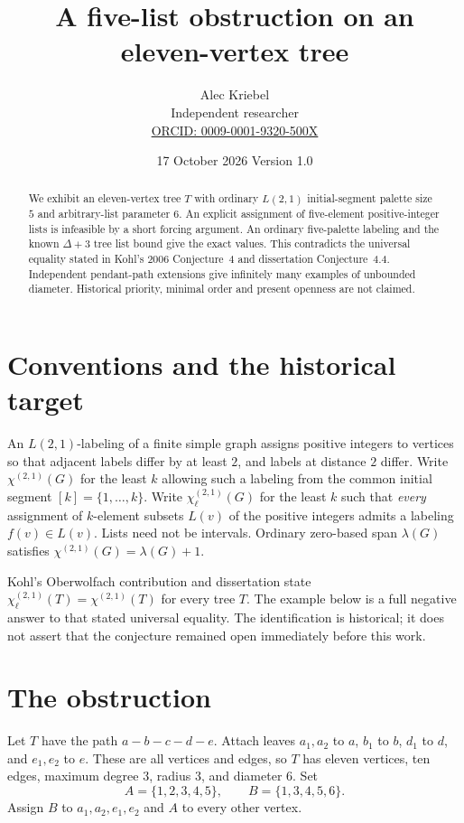 \documentclass[11pt]{article}
\title{A five-list obstruction on an eleven-vertex tree}
\author{Alec Kriebel\\
\small Independent researcher\\
\small \href{https://orcid.org/0009-0001-9320-500X}{ORCID: 0009-0001-9320-500X}}
\date{17 October 2026 \quad Version 1.0}
\newcommand{\cp}{\chi^{(2,1)}}
\newcommand{\cl}{\chi_{\ell}^{(2,1)}}
\begin{document}
\maketitle
\begin{abstract}
We exhibit an eleven-vertex tree \(T\) with ordinary \(L(2,1)\) initial-segment
palette size \(5\) and arbitrary-list parameter \(6\).
An explicit assignment of five-element positive-integer lists is infeasible
by a short forcing argument. An ordinary five-palette labeling and the known
\(\Delta+3\) tree list bound give the exact values.
This contradicts the universal equality stated in Kohl's 2006
Conjecture~4 and dissertation Conjecture~4.4.
Independent pendant-path extensions give infinitely many examples of
unbounded diameter. Historical priority, minimal order and present openness
are not claimed.
\end{abstract}

\section{Conventions and the historical target}
An \(L(2,1)\)-labeling of a finite simple graph assigns positive integers to
vertices so that adjacent labels differ by at least \(2\), and labels at
distance \(2\) differ. Write \(\cp(G)\) for the least \(k\) allowing such a
labeling from the common initial segment \([k]=\{1,\ldots,k\}\).
Write \(\cl(G)\) for the least \(k\) such that \emph{every} assignment of
\(k\)-element subsets \(L(v)\) of the positive integers admits a labeling
\(f(v)\in L(v)\). Lists need not be intervals.
Ordinary zero-based span \(\lambda(G)\) satisfies
\(\cp(G)=\lambda(G)+1\).

Kohl's Oberwolfach contribution \cite[Conjecture~4, p.~416]{kohl-owr}
and dissertation \cite[Conjecture~4.4, p.~124]{kohl-thesis}
state \(\cl(T)=\cp(T)\) for every tree \(T\).
The example below is a full negative answer to that stated universal equality.
The identification is historical; it does not assert that the conjecture
remained open immediately before this work.

\section{The obstruction}
Let \(T\) have the path \(a-b-c-d-e\). Attach leaves \(a_1,a_2\) to \(a\),
\(b_1\) to \(b\), \(d_1\) to \(d\), and \(e_1,e_2\) to \(e\).
These are all vertices and edges, so \(T\) has eleven vertices, ten edges,
maximum degree \(3\), radius \(3\), and diameter \(6\).
Set
\[
 A=\{1,2,3,4,5\},\qquad B=\{1,3,4,5,6\}.
\]
Assign \(B\) to \(a_1,a_2,e_1,e_2\) and \(A\) to every other vertex.
\end{document}
